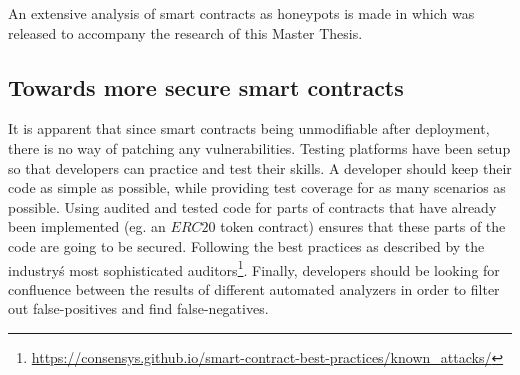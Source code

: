 An extensive analysis of smart contracts as honeypots is made in \cite{honeypots} which was released to accompany the research of this Master Thesis.


\subsection{Towards more secure smart contracts}
It is apparent that since smart contracts being unmodifiable after deployment, there is no way of patching any vulnerabilities. Testing platforms have been setup so that developers can practice and test their skills. A developer should keep their code as simple as possible, while providing test coverage for as many scenarios as possible. Using audited and tested code for parts of contracts that have already been implemented (eg. an $ERC20$ token contract) ensures that these parts of the code are going to be secured. Following the best practices as described by the industry\'s most sophisticated auditors\footnote{\url{https://consensys.github.io/smart-contract-best-practices/known_attacks/}}. Finally, developers should be looking for confluence between the results of different automated analyzers in order to filter out false-positives and find false-negatives.
